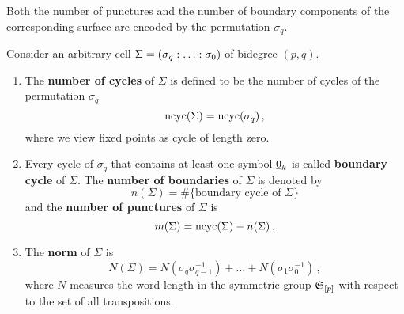 Both the number of punctures and the number of boundary components of the corresponding surface are encoded by the permutation $\sigma_q$.
\begin{defi}
    \label{cellular_models:parallel:number_cycles}
    \label{cellular_models:parallel:number_punctures}
    \label{cellular_models:parallel:number_boundaries}
    \label{cellular_models:parallel:norm}
    Consider an arbitrary cell $\Sigma = \homogq$ of bidegree $(p,q)$.
    \begin{enumerate}
        \item The {\bfseries number of cycles} of $\Sigma$ is defined to be the number of cycles of the permutation $\sigma_q$
            \[
                \operatorname{ncyc}( \Sigma ) = \operatorname{ncyc}( \sigma_q) \,,
            \]
            where we view fixed points as cycle of length zero.
        \item Every cycle of $\sigma_q$ that contains at least one symbol $\underline{\smash{0}}_k$ is called {\bfseries boundary cycle} of $\Sigma$.
            The {\bfseries number of boundaries} of $\Sigma$ is denoted by
            \[
                n(\Sigma) = \#\{ \text{boundary cycle of } \Sigma\}
            \]
            and the {\bfseries number of punctures} of $\Sigma$ is
            \[
                m(\Sigma) = \operatorname{ncyc}(\Sigma) - n(\Sigma) \,.
            \]
        \item The {\bfseries norm} of $\Sigma$ is
            \[
                N(\Sigma) = N(\sigma_q\sigma_{q-1}^{-1}) + \ldots + N(\sigma_1\sigma_0^{-1}) \,,
            \]
            where $N$ measures the word length in the symmetric group $\mathfrak S_{[p]}$ with respect to the set of all transpositions.
    \end{enumerate}
\end{defi}

